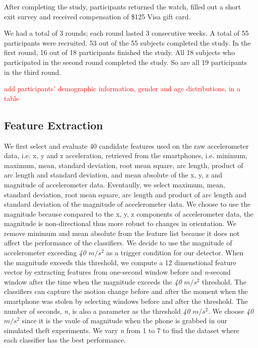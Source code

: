 \documentclass{soups}
\begin{document}
After completing the study, participants returned the watch, filled out a short exit survey and received compensation of \$125 Visa gift card.

We had a total of 3 rounds; each round lasted 3 consecutive weeks. A total of 55 participants were recruited. 53 out of the 55 subjects completed the study. In the first round, 16 out of 18 participants finished the study. All 18 subjects who participated in the second round completed the study. So are all 19 participants in the third round.

\textcolor{red}{add participants' demographic information, gender and age distributions, in a table}



\subsection{Feature Extraction}
We first select and evaluate 40 candidate features used on the raw accelerometer data, i.e. x, y and z acceleration, retrieved from the smartphones, i.e. minimum, maximum, mean, standard deviation, root mean square, arc length, product of arc length and standard deviation, and mean absolute of the x, y, z and magnitude of accelerometer data. Eventaully, we select maximum, mean, standard deviation, root mean square, arc length and product of arc length and standard deviation of the magnitude of accelerometer data. We choose to use the magnitude because compared to the x, y, z components of accelerometer data, the magnitude is non-directional thus more robust to changes in orientation. We remove minimum and mean absolute from the feature list because it does not affect the performance of the classifiers. We decide to use the magnitude of accelerometer exceeding \textit{40 $m/s^2$} as a trigger condition for our detector. When the magnitude exceeds this threshold, we compute a 12 dimenstional feature vector by extracting features from one-second window before and \textit{n}-second window after the time when the magnitude exceeds the \textit{40 $m/s^2$} threshold. The classifiers can capture the motion change before and after the moment when the smartphone was stolen by selecting windows before and after the threshold. The number of seconds, \textit{n}, is also a parameter as the threshold \textit{40 $m/s^2$}. We choose \textit{40 $m/s^2$} since it is the vaule of magnitude when the phone is grabbed in our simulated theft experiments. We vary \textit{n} from 1 to 7 to find the dataset where each classifier has the best performance.
\end{document}
